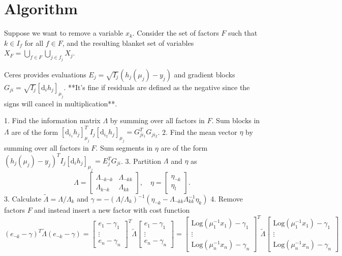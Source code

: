 \section{Algorithm}

Suppose we want to remove a variable $x_k$. Consider the set of factors $F$ such that $k \in I_f$ for all $f \in F$, and the resulting blanket set of variables $X_F = \bigcup_{f \in F} \bigcup_{j \in f_j} X_j$.

Ceres provides evaluations $E_j = \sqrt{I_j} (h_j(\mu_j) - y_j)$ and gradient blocks $G_{ji} = \sqrt{I_j} [\mathrm{d}_i h_j]_{\mu_j}$. **It's fine if residuals are defined as the negative since the signs will cancel in multiplication**.

1. Find the information matrix $\Lambda$ by summing over all factors in $F$. Sum blocks in $\Lambda$ are of the form $[\mathrm{d}_{i_1} h_j]_{\mu_j}^T I_j [\mathrm{d}_{i_2} h_j]_{\mu_j} = G_{ji_1}^T G_{ji_2}$.
2. Find the mean vector $\eta$ by summing over all factors in $F$. Sum segments in $\eta$ are of the form $(h_j(\mu_j) - y_j)^T I_j [\mathrm{d}_i h_j]_{\mu_j} = E_{j}^TG_{ji}$.
3. Partition $\Lambda$ and $\eta$ as
$$
  \Lambda = \begin{bmatrix}
    \Lambda_{\lnot k \lnot k} & \Lambda_{\lnot k k} \\ \Lambda_{k \lnot k} & \Lambda_{kk}
  \end{bmatrix}, \quad \eta = \begin{bmatrix}
    \eta_{\lnot k} \\
    \eta_l
  \end{bmatrix}.
$$
3. Calculate $\tilde \Lambda = \Lambda/ \Lambda_{k}$ and $\gamma = - (\Lambda / \Lambda_k)^{-1} \left( \eta_{\lnot k} - \Lambda_{\lnot k k} \Lambda_{kk}^{-1}   \eta_k \right)$
4. Remove factors $F$ and instead insert a new factor with cost function
$$
  (e_{\lnot k} - \gamma)^T \tilde \Lambda (e_{\lnot k} - \gamma) =
  \begin{bmatrix}
    e_1 - \gamma_1 \\
    \vdots         \\
    e_n - \gamma_n
  \end{bmatrix}^T \tilde \Lambda \begin{bmatrix}
    e_1 - \gamma_1 \\
    \vdots         \\
    e_n - \gamma_n
  \end{bmatrix} =
  \begin{bmatrix}
    \mathrm{Log}(\mu_1^{-1} x_1) - \gamma_1 \\
    \vdots                                  \\
    \mathrm{Log}(\mu_n^{-1} x_n) - \gamma_n
  \end{bmatrix}^T \tilde \Lambda \begin{bmatrix}
    \mathrm{Log}(\mu_1^{-1} x_1) - \gamma_1 \\
    \vdots                                  \\
    \mathrm{Log}(\mu_n^{-1} x_n) - \gamma_n
  \end{bmatrix}
$$

